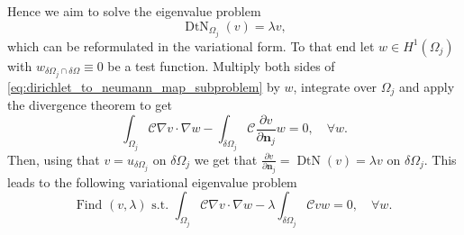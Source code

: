 Hence we aim to solve the eigenvalue problem
\[
  \operatorname{DtN}_{\Omega_j}\left(v\right) = \lambda v,
\]
which can be reformulated in the variational form. To that end let $w\in H^1(\Omega_j)$ with $w_{\delta\Omega_j\cap\delta\Omega} \equiv 0$ be a test function. Multiply both sides of \cref{eq:dirichlet_to_neumann_map_subproblem} by $w$, integrate over $\Omega_j$ and apply the divergence theorem to get
\[
  \int_{\Omega_j} \mathcal{C}\nabla v \cdot \nabla w - \int_{\delta\Omega_j} \mathcal{C}\frac{\partial v}{\partial \mathbf{n}_j}w = 0, \quad \forall w.
\]
Then, using that $v=u_{\delta\Omega_j}$ on $\delta\Omega_j$ we get that $\frac{\partial v}{\partial \mathbf{n}_j} = \operatorname{DtN}(v) = \lambda v $ on $\delta\Omega_j$. This leads to the following variational eigenvalue problem
\begin{equation}
  \text{Find } (v, \lambda) \text{ s.t. } \int_{\Omega_j} \mathcal{C}\nabla v \cdot \nabla w - \lambda \int_{\delta\Omega_j} \mathcal{C}vw = 0, \quad \forall w.
  \label{eq:dirichlet_to_neumann_map_eigenproblem}
\end{equation}